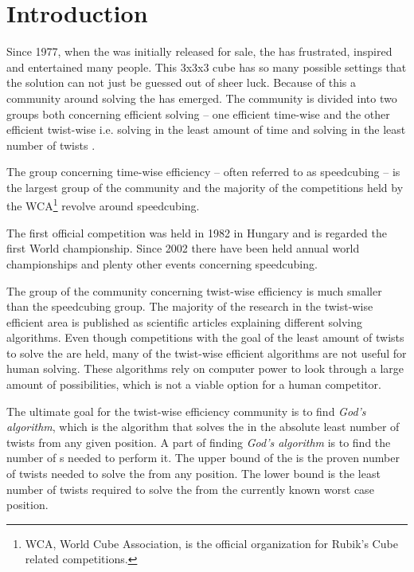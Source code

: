 \chapter{Introduction}
\emptyTop{}
Since 1977, when the \rubik{} was initially released for sale, the \rubik{} has frustrated, inspired and entertained many people. This 3x3x3 cube has so many possible settings that the solution can not just be guessed out of sheer luck. Because of this a community around solving the \rubik{} has emerged. The community is divided into two groups both concerning efficient solving -- one efficient time-wise and the other efficient twist-wise i.e. solving in the least amount of time and solving in the least number of twists \cite{speedsolving.forum}. 

The group concerning time-wise efficiency -- often referred to as speedcubing -- is the largest group of the community and the majority of the competitions held by the WCA\footnote{WCA, World Cube Association, is the official organization for Rubik's Cube related competitions.} \cite{wca} revolve around speedcubing.

The first official competition was held in 1982 in Hungary and is regarded the first World championship. Since 2002 there have been held annual world championships and plenty other events concerning speedcubing. 

The group of the community concerning twist-wise efficiency is much smaller than the speedcubing group. 
The majority of the research in the twist-wise efficient area is published as scientific articles explaining different solving algorithms. 
Even though competitions with the goal of the least amount of twists to solve the \cube{} are held, many of the twist-wise efficient algorithms are not useful for human solving. 
These algorithms rely on computer power to look through a large amount of possibilities, which is not a viable option for a human competitor.

The ultimate goal for the twist-wise efficiency community is to find \textit{God's algorithm}, which is the algorithm that solves the \cube{} in the absolute least number of twists from any given position. A part of finding \textit{God's algorithm} is to find the number of \twist{}s needed to perform it. 
The upper bound of the \rubik{} is the proven number of twists needed to solve the \cube{} from any position. The lower bound is the least number of twists required to solve the \cube{} from the currently known worst case position. 